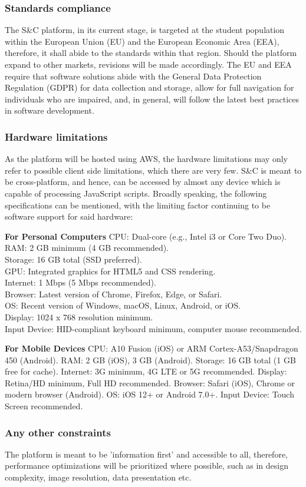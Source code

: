 \subsubsection{Standards compliance}
The S\&C platform, in its current stage, is targeted at the student population within the European Union (EU) and the European Economic Area (EEA), therefore, it shall abide to the standards within that region. Should the platform expand to other markets, revisions will be made accordingly.
The EU and EEA require that software solutions abide with the General Data Protection Regulation (GDPR) for data collection and storage, allow for full navigation for individuals who are impaired, and, in general, will follow the latest best practices in software development.
\subsubsection{Hardware limitations}
As the platform will be hosted using AWS, the hardware limitations may only refer to possible client side limitations, which there are very few. S\&C is meant to be cross-platform, and hence, can be accessed by almost any device which is capable of processing JavaScript scripts. Broadly speaking, the following specifications can be mentioned, with the limiting factor continuing to be software support for said hardware:

\textbf{For Personal Computers}
CPU: Dual-core (e.g., Intel i3 or Core Two Duo). \\
RAM: 2 GB minimum (4 GB recommended). \\
Storage: 16 GB total (SSD preferred). \\
GPU: Integrated graphics for HTML5 and CSS rendering. \\
Internet: 1 Mbps (5 Mbps recommended). \\
Browser: Latest version of Chrome, Firefox, Edge, or Safari. \\
OS: Recent version of Windows, macOS, Linux, Android, or iOS. \\
Display: 1024 x 768 resolution minimum. \\
Input Device: HID-compliant keyboard minimum, computer mouse recommended.

\textbf{For Mobile Devices}
CPU: A10 Fusion (iOS) or ARM Cortex-A53/Snapdragon 450 (Android).
RAM: 2 GB (iOS), 3 GB (Android).
Storage: 16 GB total (1 GB free for cache).
Internet: 3G minimum, 4G LTE or 5G recommended.
Display: Retina/HD minimum, Full HD recommended.
Browser: Safari (iOS), Chrome or modern browser (Android).
OS: iOS 12+ or Android 7.0+.
Input Device: Touch Screen recommended.

\subsubsection{Any other constraints}
The platform is meant to be 'information first' and accessible to all, therefore, performance optimizations will be prioritized where possible, such as in design complexity, image resolution, data presentation etc.
